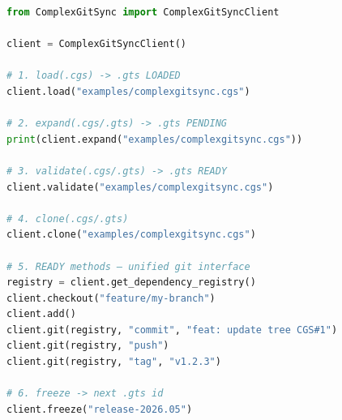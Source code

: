 \begin{lstlisting}[language=Python]
from ComplexGitSync import ComplexGitSyncClient

client = ComplexGitSyncClient()

# 1. load(.cgs) -> .gts LOADED
client.load("examples/complexgitsync.cgs")

# 2. expand(.cgs/.gts) -> .gts PENDING
print(client.expand("examples/complexgitsync.cgs"))

# 3. validate(.cgs/.gts) -> .gts READY
client.validate("examples/complexgitsync.cgs")

# 4. clone(.cgs/.gts)
client.clone("examples/complexgitsync.cgs")

# 5. READY methods — unified git interface
registry = client.get_dependency_registry()
client.checkout("feature/my-branch")
client.add()
client.git(registry, "commit", "feat: update tree CGS#1")
client.git(registry, "push")
client.git(registry, "tag", "v1.2.3")

# 6. freeze -> next .gts id
client.freeze("release-2026.05")
\end{lstlisting}
